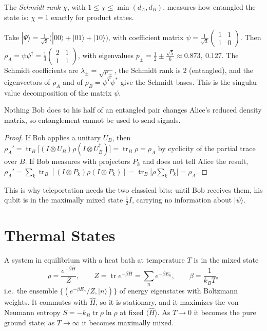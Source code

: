 The \emph{Schmidt rank} $\chi$, with $1\le\chi\le\min(d_A,d_B)$, measures how entangled the state is: $\chi = 1$ exactly for product states.

\begin{example}
Take $|\Psi\rangle = \frac{1}{\sqrt3}\bigl(|00\rangle + |01\rangle + |10\rangle\bigr)$, with coefficient matrix $\psi = \frac{1}{\sqrt3}\begin{pmatrix}1&1\\1&0\end{pmatrix}$. Then $\rho_A = \psi\psi^\dagger = \frac13\begin{pmatrix}2&1\\1&1\end{pmatrix}$, with eigenvalues $p_\pm = \frac12\pm\frac{\sqrt5}{6}\approx0.873,\ 0.127$. The Schmidt coefficients are $\lambda_\pm = \sqrt{p_\pm}$, the Schmidt rank is 2 (entangled), and the eigenvectors of $\rho_A$ and of $\rho_B = \psi^T\psi^*$ give the Schmidt bases. This is the singular value decomposition of the matrix $\psi$.
\end{example}

\begin{theorem}
Nothing Bob does to his half of an entangled pair changes Alice's reduced density matrix, so entanglement cannot be used to send signals.
\end{theorem}
\begin{proof}
If Bob applies a unitary $U_B$, then $\rho_A' = \operatorname{tr}_B\bigl[(I\otimes U_B)\rho(I\otimes U_B^\dagger)\bigr] = \operatorname{tr}_B\rho = \rho_A$ by cyclicity of the partial trace over $B$. If Bob measures with projectors $P_k$ and does not tell Alice the result, $\rho_A' = \sum_k\operatorname{tr}_B[(I\otimes P_k)\rho(I\otimes P_k)] = \operatorname{tr}_B\bigl[\rho\sum_kP_k\bigr] = \rho_A$.
\end{proof}

This is why teleportation needs the two classical bits: until Bob receives them, his qubit is in the maximally mixed state $\frac12I$, carrying no information about $|\psi\rangle$.

\section{Thermal States}

A system in equilibrium with a heat bath at temperature $T$ is in the mixed state
\[
    \rho = \frac{e^{-\beta\hat{H}}}{Z},
    \qquad
    Z = \operatorname{tr}e^{-\beta\hat{H}} = \sum_ne^{-\beta E_n},
    \qquad
    \beta = \frac{1}{k_BT},
\]
i.e.\ the ensemble $\{(e^{-\beta E_n}/Z,|n\rangle)\}$ of energy eigenstates with Boltzmann weights. It commutes with $\hat{H}$, so it is stationary, and it maximizes the von Neumann entropy $S = -k_B\operatorname{tr}\rho\ln\rho$ at fixed $\langle\hat{H}\rangle$. As $T\to0$ it becomes the pure ground state; as $T\to\infty$ it becomes maximally mixed.

